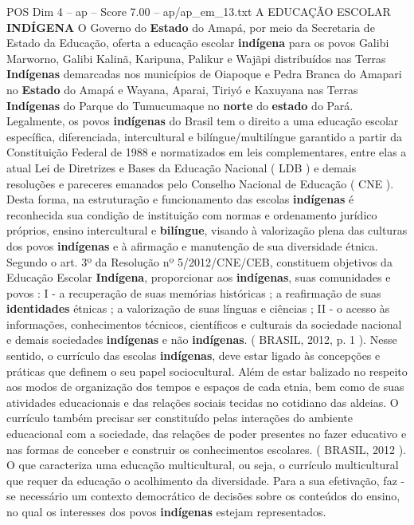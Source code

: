 \begin{textsample}{POS Dim 4 – ap – Score 7.00 – ap/ap\_em\_13.txt}  \label{ex:f4_pos_240}
A EDUCAÇÃO ESCOLAR \textbf{INDÍGENA} O Governo do \textbf{Estado} do Amapá, por meio da Secretaria de Estado da Educação, oferta a educação escolar \textbf{indígena} para os povos Galibi Marworno, Galibi Kalinã, Karipuna, Palikur e Wajãpi distribuídos nas Terras \textbf{Indígenas} demarcadas nos municípios de Oiapoque e Pedra Branca do Amapari no \textbf{Estado} do Amapá e Wayana, Aparai, Tiriyó e Kaxuyana nas Terras \textbf{Indígenas} do Parque do Tumucumaque no \textbf{norte} do \textbf{estado} do Pará.
Legalmente, os povos \textbf{indígenas} do Brasil tem o direito a uma educação escolar específica, diferenciada, intercultural e bilíngue/multilíngue garantido a partir da Constituição Federal de 1988 e normatizados em leis complementares, entre elas a atual Lei de Diretrizes e Bases da Educação Nacional ( LDB ) e demais resoluções e pareceres emanados pelo Conselho Nacional de Educação ( CNE ).
Desta forma, na estruturação e funcionamento das escolas \textbf{indígenas} é reconhecida sua condição de instituição com normas e ordenamento jurídico próprios, ensino intercultural e \textbf{bilíngue}, visando à valorização plena das culturas dos povos \textbf{indígenas} e à afirmação e manutenção de sua diversidade étnica.
Segundo o art. 3º da Resolução nº 5/2012/CNE/CEB, constituem objetivos da Educação Escolar \textbf{Indígena}, proporcionar aos \textbf{indígenas}, suas comunidades e povos : I - a recuperação de suas memórias históricas ; a reafirmação de suas \textbf{identidades} étnicas ; a valorização de suas línguas e ciências ; II - o acesso às informações, conhecimentos técnicos, científicos e culturais da sociedade nacional e demais sociedades \textbf{indígenas} e não \textbf{indígenas}. ( BRASIL, 2012, p. 1 ).
Nesse sentido, o currículo das escolas \textbf{indígenas}, deve estar ligado às concepções e práticas que definem o seu papel sociocultural.
Além de estar balizado no respeito aos modos de organização dos tempos e espaços de cada etnia, bem como de suas atividades educacionais e das relações sociais tecidas no cotidiano das aldeias.
O currículo também precisar ser constituído pelas interações do ambiente educacional com a sociedade, das relações de poder presentes no fazer educativo e nas formas de conceber e construir os conhecimentos escolares. ( BRASIL, 2012 ).
O que caracteriza uma educação multicultural, ou seja, o currículo multicultural que requer da educação o acolhimento da diversidade.
Para a sua efetivação, faz -se necessário um contexto democrático de decisões sobre os conteúdos do ensino, no qual os interesses dos povos \textbf{indígenas} estejam representados.

\end{textsample}
